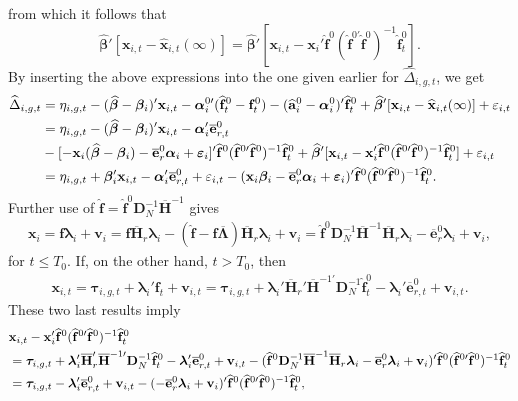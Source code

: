 \documentclass[12pt,fleqn]{article}
\def\*#1{\mathbf{#1}}
\def\+#1{\boldsymbol{#1}}
\begin{document}
from which it follows that
\begin{equation}
\widehat{\+\beta}'[\*x_{i,t} - \widehat{\*x}_{i,t}(\infty)] = \widehat{\+\beta}'[\*x_{i,t} - \*x_i'\widehat{\*f}^0( \widehat{\*f}^{0\prime} \widehat{\*f}^0 )^{-1} \widehat{\*f}_t^0].
\end{equation}
By inserting the above expressions into the one given earlier for $\widehat \Delta_{i,g,t}$, we get
\begin{align}
\widehat \Delta_{i,g,t} & = \eta_{i,g,t} - (\widehat{\+\beta} - \+\beta_i)'\*x_{i,t} - \+\alpha_i^{0\prime}(\widehat{\*f}_t^0-\*f_t^0) - (\widehat{\*a}_i^{0} - \+\alpha_i^0)'\widehat{\*f}_t^0 + \widehat{\+\beta}'[\*x_{i,t} - \widehat{\*x}_{i,t}(\infty)] + \varepsilon_{i,t}\notag\\
& = \eta_{i,g,t} - (\widehat{\+\beta} - \+\beta_i)'\*x_{i,t} - \+\alpha_i'\overline{\*e}_{r,t}^0 \notag\\
& - [- \*x_{i}(\widehat{\+\beta}-\+\beta_i)  - \overline{\*e}_{r}^0\+\alpha_i +  \+\varepsilon_{i} ]' \widehat{\*f}^{0} (\widehat{\*f}^{0\prime}\widehat{\*f}^0)^{-1}\widehat{\*f}_t^0 + \widehat{\+\beta}'[\*x_{i,t} - \*x_i'\widehat{\*f}^0( \widehat{\*f}^{0\prime} \widehat{\*f}^0 )^{-1} \widehat{\*f}_t^0] + \varepsilon_{i,t}\notag\\
& = \eta_{i,g,t} + \+\beta_i'\*x_{i,t} - \+\alpha_i'\overline{\*e}_{r,t}^0 + \varepsilon_{i,t} - ( \*x_{i}\+\beta_i  - \overline{\*e}_{r}^0\+\alpha_i +  \+\varepsilon_{i} )' \widehat{\*f}^{0} (\widehat{\*f}^{0\prime}\widehat{\*f}^0)^{-1}\widehat{\*f}_t^0  .
\end{align}
Further use of $\widehat{\*f} = \widehat{\*f}^0\*D_{N}^{-1}\overline{\*H}^{-1}$ gives
\begin{eqnarray}
\*x_i = \*f\+\lambda_i + \*v_i = \widehat{\*f}\overline{\*H}_{r}\+\lambda_i -  (\widehat{\*f} - \*f\overline{\+\Lambda})\overline{\*H}_{r}\+\lambda_i  + \*v_i =  \widehat{\*f}^0\*D_{N}^{-1}\overline{\*H}^{-1}\overline{\*H}_{r}\+\lambda_i  - \overline{\*e}_{r}^0\+\lambda_i  + \*v_i ,
\end{eqnarray}
for $t\leq T_0$. If, on the other hand, $t > T_0$, then 
\begin{eqnarray}
\*x_{i,t} = \+\tau_{i,g,t} + \+\lambda_i'\*f_t + \*v_{i,t} =  \+\tau_{i,g,t} + \+\lambda_i' \overline{\*H}_{r}'\overline{\*H}^{-1\prime}\*D_{N}^{-1}\widehat{\*f}_t^0  - \+\lambda_i'\overline{\*e}_{r,t}^0  + \*v_{i,t}.
\end{eqnarray}
These two last results imply
\begin{align}
& \*x_{i,t} -  \*x_{i}' \widehat{\*f}^{0}(\widehat{\*f}^{0\prime}\widehat{\*f}^0)^{-1}\widehat{\*f}_t^0 \notag\\
& = \+\tau_{i,g,t} + \+\lambda_i' \overline{\*H}_{r}'\overline{\*H}^{-1\prime}\*D_{N}^{-1}\widehat{\*f}_t^0  - \+\lambda_i'\overline{\*e}_{r,t}^0  + \*v_{i,t} -  (\widehat{\*f}^0\*D_{N}^{-1}\overline{\*H}^{-1}\overline{\*H}_{r}\+\lambda_i  - \overline{\*e}_{r}^0\+\lambda_i  + \*v_i)' \widehat{\*f}^{0}(\widehat{\*f}^{0\prime}\widehat{\*f}^0)^{-1}\widehat{\*f}_t^0\notag\\
& = \+\tau_{i,g,t}  - \+\lambda_i'\overline{\*e}_{r,t}^0  + \*v_{i,t} -  ( - \overline{\*e}_{r}^0\+\lambda_i  + \*v_i)' \widehat{\*f}^{0}(\widehat{\*f}^{0\prime}\widehat{\*f}^0)^{-1}\widehat{\*f}_t^0,
\end{align}
\end{document}

